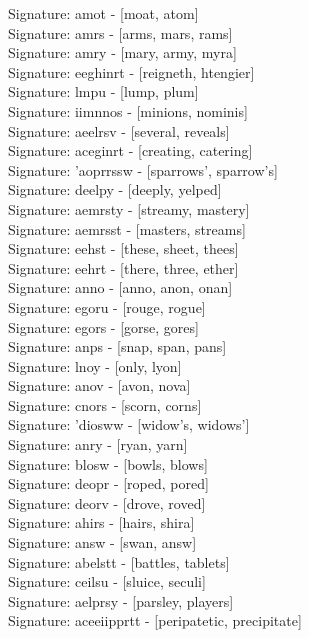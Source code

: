 Signature: {amot} - [moat, atom] \\
Signature: {amrs} - [arms, mars, rams] \\
Signature: {amry} - [mary, army, myra] \\
Signature: {eeghinrt} - [reigneth, htengier] \\
Signature: {lmpu} - [lump, plum] \\
Signature: {iimnnos} - [minions, nominis] \\
Signature: {aeelrsv} - [several, reveals] \\
Signature: {aceginrt} - [creating, catering] \\
Signature: {'aoprrssw} - [sparrows', sparrow's] \\
Signature: {deelpy} - [deeply, yelped] \\
Signature: {aemrsty} - [streamy, mastery] \\
Signature: {aemrsst} - [masters, streams] \\
Signature: {eehst} - [these, sheet, thees] \\
Signature: {eehrt} - [there, three, ether] \\
Signature: {anno} - [anno, anon, onan] \\
Signature: {egoru} - [rouge, rogue] \\
Signature: {egors} - [gorse, gores] \\
Signature: {anps} - [snap, span, pans] \\
Signature: {lnoy} - [only, lyon] \\
Signature: {anov} - [avon, nova] \\
Signature: {cnors} - [scorn, corns] \\
Signature: {'diosww} - [widow's, widows'] \\
Signature: {anry} - [ryan, yarn] \\
Signature: {blosw} - [bowls, blows] \\
Signature: {deopr} - [roped, pored] \\
Signature: {deorv} - [drove, roved] \\
Signature: {ahirs} - [hairs, shira] \\
Signature: {answ} - [swan, answ] \\
Signature: {abelstt} - [battles, tablets] \\
Signature: {ceilsu} - [sluice, seculi] \\
Signature: {aelprsy} - [parsley, players] \\
Signature: {aceeiipprtt} - [peripatetic, precipitate] \\
